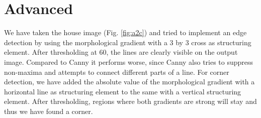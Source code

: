 \documentclass[11pt,a4paper]{article}
\begin{document}
\section{Advanced}
We have taken the house image (Fig. \ref{fig:a2c}) and tried to implement an edge detection by using the morphological gradient with a 3 by 3 cross as structuring element. After thresholding at 60, the lines are clearly visible on the output image. Compared to Canny it performs worse, since Canny also tries to suppress non-maxima and attempts to connect different parts of a line.
For corner detection, we have added the absolute value of the morphological gradient with a horizontal line as structuring element to the same with a vertical structuring element. After thresholding, regions where both gradients are strong will stay and thus we have found a corner.
\end{document}
